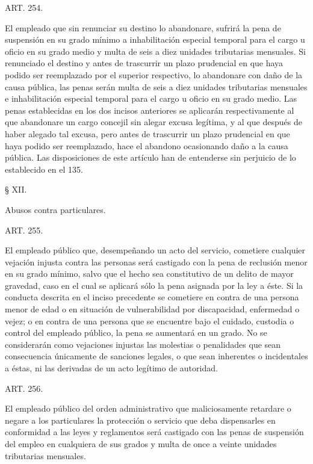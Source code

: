     ART. 254.

    El empleado que sin renunciar su destino lo abandonare, sufrirá la pena de suspensión en su grado mínimo a inhabilitación especial temporal para el cargo u oficio en su grado medio y multa de seis a diez unidades tributarias mensuales.
    Si renunciado el destino y antes de trascurrir un plazo prudencial en que haya podido ser reemplazado por el superior respectivo, lo abandonare con daño de la causa pública, las penas serán multa de seis a diez unidades tributarias mensuales e inhabilitación especial temporal para el cargo u oficio en su grado medio.
    Las penas establecidas en los dos incisos anteriores se aplicarán respectivamente al que abandonare un cargo concejil sin alegar excusa legítima, y al que después de haber alegado tal excusa, pero antes de trascurrir un plazo prudencial en que haya podido ser reemplazado, hace el abandono ocasionando daño a la causa pública.
    Las disposiciones de este artículo han de entenderse sin perjuicio de lo establecido en el 135.




    § XII.

    Abusos contra particulares.

    ART. 255.

    El empleado público que, desempeñando un acto del servicio, cometiere cualquier vejación injusta contra las personas será castigado con la pena de reclusión menor en su grado mínimo, salvo que el hecho sea constitutivo de un delito de mayor gravedad, caso en el cual se aplicará sólo la pena asignada por la ley a éste.
    Si la conducta descrita en el inciso precedente se cometiere en contra de una persona menor de edad o en situación de vulnerabilidad por discapacidad, enfermedad o vejez; o en contra de una persona que se encuentre bajo el cuidado, custodia o control del empleado público, la pena se aumentará en un grado.
    No se considerarán como vejaciones injustas las molestias o penalidades que sean consecuencia únicamente de sanciones legales, o que sean inherentes o incidentales a éstas, ni las derivadas de un acto legítimo de autoridad.

    ART. 256.

    El empleado público del orden administrativo que maliciosamente retardare o negare a los particulares la protección o servicio que deba dispensarles en conformidad a las leyes y reglamentos será castigado con las penas de suspensión del empleo en cualquiera de sus grados y multa de once a veinte unidades tributarias mensuales.



